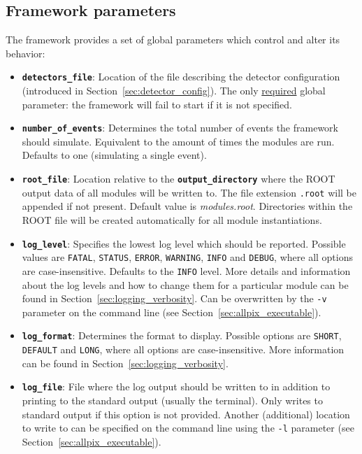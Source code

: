 \subsection{Framework parameters}
\label{sec:framework_parameters}
The \apsq framework provides a set of global parameters which control and alter its behavior:
\begin{itemize}
\item \textbf{\texttt{detectors\_file}}: Location of the file describing the detector configuration (introduced in Section~\ref{sec:detector_config}).
The only \underline{required} global parameter: the framework will fail to start if it is not specified.
\item \textbf{\texttt{number\_of\_events}}: Determines the total number of events the framework should simulate.
Equivalent to the amount of times the modules are run.
Defaults to one (simulating a single event).
\item \textbf{\texttt{root\_file}}: Location relative to the \textbf{\texttt{output\_directory}} where the ROOT output data of all modules will be written to. The file extension \texttt{.root} will be appended if not present.
Default value is \textit{modules.root}.
Directories within the ROOT file will be created automatically for all module instantiations.
\item \textbf{\texttt{log\_level}}: Specifies the lowest log level which should be reported.
Possible values are \texttt{FATAL}, \texttt{STATUS}, \texttt{ERROR}, \texttt{WARNING}, \texttt{INFO} and \texttt{DEBUG}, where all options are case-insensitive.
Defaults to the \texttt{INFO} level.
More details and information about the log levels and how to change them for a particular module can be found in Section~\ref{sec:logging_verbosity}.
Can be overwritten by the \texttt{-v} parameter on the command line (see Section~\ref{sec:allpix_executable}).
\item \textbf{\texttt{log\_format}}: Determines the format to display.
Possible options are \texttt{SHORT}, \texttt{DEFAULT} and \texttt{LONG}, where all options are case-insensitive.
More information can be found in Section~\ref{sec:logging_verbosity}.
\item \textbf{\texttt{log\_file}}: File where the log output should be written to in addition to printing to the standard output (usually the terminal).
Only writes to standard output if this option is not provided.
Another (additional) location to write to can be specified on the command line using the \texttt{-l} parameter (see Section~\ref{sec:allpix_executable}).

\end{itemize}

